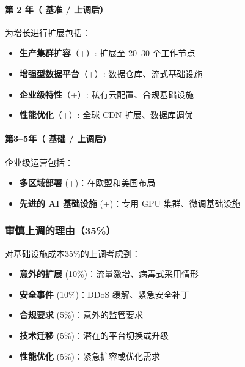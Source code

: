 \documentclass[11pt, a4paper, oneside]{article}
\begin{document}
\paragraph{第 2 年（ 基准 /  上调后）}
为增长进行扩展包括：
\begin{itemize}
    \item \textbf{生产集群扩容}（+）: 扩展至 20--30 个工作节点
    \item \textbf{增强型数据平台}（+）: 数据仓库、流式基础设施
    \item \textbf{企业级特性}（+）: 私有云配置、合规基础设施
    \item \textbf{性能优化}（+）: 全球 CDN 扩展、数据库调优



\end{itemize}

\paragraph{第3--5年（ 基础 /  上调后）}
企业级运营包括：
\begin{itemize}
    \item \textbf{多区域部署} (+)：在欧盟和美国布局
    \item \textbf{先进的 AI 基础设施} (+)：专用 GPU 集群、微调基础设施
\end{itemize}

\subsubsection{审慎上调的理由（35\%）}
对基础设施成本35\%的上调考虑到：
\begin{itemize}
    \item \textbf{意外的扩展} (10\%)：流量激增、病毒式采用情形
    \item \textbf{安全事件} (10\%)：DDoS 缓解、紧急安全补丁
    \item \textbf{合规要求} (5\%)：意外的监管要求
    \item \textbf{技术迁移} (5\%)：潜在的平台切换或升级
    \item \textbf{性能优化} (5\%)：紧急扩容或优化需求
\end{itemize}
\end{document}
